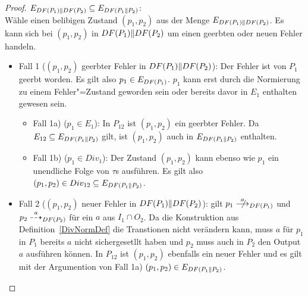 \begin{proof}
  $E_{DF (P_1)\| DF (P_2)} \subseteq E_{DF (P_1\|P_2)}$:\\
  Wähle einen belibigen Zustand $(p_1,p_2)$ aus der Menge $E_{DF (P_1)\| DF
  (P_2)}$. Es kann sich bei $(p_1,p_2)$ in $DF (P_1)\| DF (P_2)$ um einen
  geerbten oder neuen Fehler handeln.
  \begin{itemize}
    \item Fall 1 ($(p_1,p_2)$ geerbter Fehler in $DF (P_1)\| DF (P_2)$): Der
      Fehler ist \oBdA{} von $P_1$ geerbt worden. Es gilt also $p_1\in E_{DF
      (P_1)}$. $p_1$ kann erst durch die Normierung zu einem Fehler"=Zustand
      geworden sein oder bereits davor in $E_1$ enthalten gewesen sein.
      \begin{itemize}
        \item Fall 1a) ($p_1\in E_1$): In $P_{12}$ ist $(p_1,p_2)$ ein geerbter
          Fehler. Da $E_{12}\subseteq E_{DF (P_1\|P_2)}$ gilt, ist $(p_1,p_2)$
          auch in $E_{DF (P_1\|P_2)}$ enthalten.
        \item Fall 1b) ($p_1\in Div_1$): Der Zustand $(p_1,p_2)$ kann ebenso
          wie $p_1$ ein unendliche Folge von $\tau$s ausführen. Es gilt also
          $(p_1,p_2)\in Div_{12}\subseteq E_{DF (P_1\|P_2)}$.
      \end{itemize}
    \item Fall 2 ($(p_1,p_2)$ neuer Fehler in $DF (P_1)\| DF (P_2)$): \OBdA{}
      gilt $p_1\nmust[a]_{\DF (P_1)}$ und $p_2\may[a]_{\DF (P_2)}$ für ein $a$
      aus $I_1\cap O_2$. Da die Konstruktion aus Definition~\ref{DivNormDef}
      die Transtionen nicht verändern kann, muss $a$ für $p_1$ in $P_1$ bereits
      $a$ nicht sichergesetllt haben und $p_2$ muss auch in $P_2$ den Output
      $a$ ausführen können. In $P_{12}$ ist $(p_1,p_2)$ ebenfalls ein neuer
      Fehler und es gilt mit der Argumention von Fall 1a) $(p_1,p_2)\in E_{DF
      (P_1\|P_2)}$.
  \end{itemize}
\end{proof}

